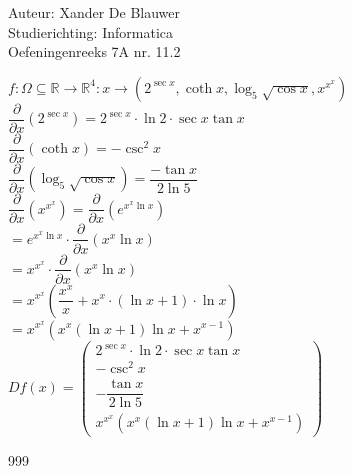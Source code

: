 \documentclass[a4paper]{article}
\begin{document}
\noindent \large Auteur: Xander De Blauwer \\
\noindent \large Studierichting: Informatica\\
\noindent \large Oefeningenreeks 7A nr. 11.2\\

\medskip

\normalsize

$f : \Omega \subseteq \mathbb{R} \to \mathbb{R}^4: x\rightarrow \left(2^{\sec{x}}, \coth{x}, \log_5 \sqrt{\cos{x}},x^{{x}^x}\right) $ \\

$\dfrac{\partial }{\partial x}(2^{\sec{x}}) = 2^{\sec x} \cdot \ln 2 \cdot \sec x \tan x$ \\

$\dfrac{\partial }{\partial x}(\coth{x}) = -\csc^2{x} $ \\

$\dfrac{\partial }{\partial x}(\log_5 \sqrt{\cos{x}}) = \dfrac{-\tan{x}}{2\ln{5}} $ \\

$\dfrac{\partial }{\partial x}\left(x^{{x}^x}\right) = \dfrac{\partial }{\partial x}(e^{x{^x}\ln{x}})$ \\ 

$ = e^{x{^x}\ln{x}} \cdot \dfrac{\partial }{\partial x}(x^{x}\ln{x}) $ \\

$ = x^{{x}^x} \cdot \dfrac{\partial }{\partial x}(x^{x}\ln{x}) $ \\

$ = x^{{x}^x} \left(\dfrac{x^x}{x} + x^x \cdot (\ln{x} + 1)\cdot \ln{x}\right) $ \\

$ = x^{{x}^x} \left(x^{x}(\ln{x}+1)\ln{x} + x^{x-1} \right)$ \\ 


$Df(x)= \left(\begin{array}{c}
2^{\sec x} \cdot\ln 2  \cdot\sec x \tan x \\
-\csc^2 x \\
-\dfrac{\tan x}{2\ln 5} \\
x^{x^x}\left(x^{x}(\ln x+1)\ln x + x^{x-1}\right)
\end{array}\right)$ \\










\begin{thebibliography}{999}
\end{thebibliography}
\end{document}
